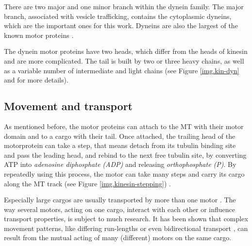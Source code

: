 There are two major and one minor branch within the dynein family. The major branch, associated with vesicle trafficking, contains the cytoplasmic dyneins, which are the important ones for this
work. Dyneins are also the largest of the known motor proteins \cite{alberts}.


The dynein motor proteins have two heads, which differ from the heads of kinesin and are more complicated. The tail is built by two or three heavy chains, as well as a variable number of
intermediate and light chains (see Figure \ref{img.kin-dyn} and \cite{alberts} for more details).

\subsection{Movement and transport}\label{ss.move-and-transport}
As mentioned before, the motor proteins can attach to the MT with their motor domain and to a cargo with their tail. Once attached, the trailing head of the motorprotein can take a step, that
means detach from its tubulin binding site and pass the leading head, and rebind to the next free tubulin site, by converting ATP into \textit{adenosine diphosphate (ADP)} and releasing
\textit{orthophosphate (P)}. By repeatedly using this process, the motor can take many steps and carry its cargo along the MT track (see Figure \ref{img.kinesin-stepping}) \cite{alberts}.


Especially large cargos are usually transported by more than one motor \cite{nature422}. The way several motors, acting on one cargo, interact with each other or
influence transport properties, is subject to much research. It has been shown that complex movement patterns, like differing run-lengths \cite{pnas102} or even bidirectional transport
\cite{cb14, pnas105}, can result from the mutual acting of many (different) motors on the same cargo.

